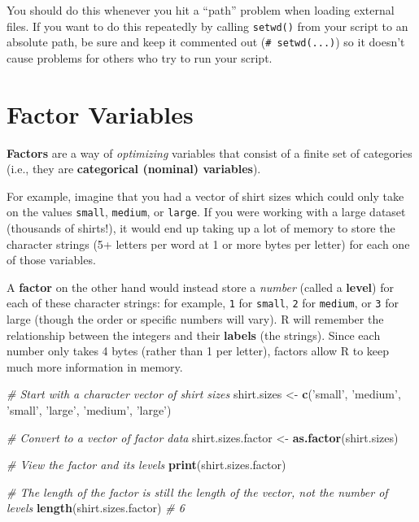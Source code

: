 \documentclass[]{book}
\newenvironment{Shaded}{\begin{snugshade}}{\end{snugshade}}
\newcommand{\KeywordTok}[1]{\textcolor[rgb]{0.13,0.29,0.53}{\textbf{#1}}}
\newcommand{\StringTok}[1]{\textcolor[rgb]{0.31,0.60,0.02}{#1}}
\newcommand{\CommentTok}[1]{\textcolor[rgb]{0.56,0.35,0.01}{\textit{#1}}}
\newcommand{\NormalTok}[1]{#1}
\theoremstyle{definition}
\theoremstyle{definition}
\theoremstyle{remark}
\begin{document}
You should do this whenever you hit a ``path'' problem when loading
external files. If you want to do this repeatedly by calling
\texttt{setwd()} from your script to an absolute path, be sure and keep
it commented out (\texttt{\#\ setwd(...)}) so it doesn't cause problems
for others who try to run your script.

\hypertarget{factors}{\section{Factor Variables}\label{factors}}

\textbf{Factors} are a way of \emph{optimizing} variables that consist
of a finite set of categories (i.e., they are \textbf{categorical
(nominal) variables}).

For example, imagine that you had a vector of shirt sizes which could
only take on the values \texttt{small}, \texttt{medium}, or
\texttt{large}. If you were working with a large dataset (thousands of
shirts!), it would end up taking up a lot of memory to store the
character strings (5+ letters per word at 1 or more bytes per letter)
for each one of those variables.

A \textbf{factor} on the other hand would instead store a \emph{number}
(called a \textbf{level}) for each of these character strings: for
example, \texttt{1} for \texttt{small}, \texttt{2} for \texttt{medium},
or \texttt{3} for large (though the order or specific numbers will
vary). R will remember the relationship between the integers and their
\textbf{labels} (the strings). Since each number only takes 4 bytes
(rather than 1 per letter), factors allow R to keep much more
information in memory.

\begin{Shaded}
\begin{Highlighting}[]
\CommentTok{# Start with a character vector of shirt sizes}
\NormalTok{shirt.sizes <-}\StringTok{ }\KeywordTok{c}\NormalTok{(}\StringTok{'small'}\NormalTok{, }\StringTok{'medium'}\NormalTok{, }\StringTok{'small'}\NormalTok{, }\StringTok{'large'}\NormalTok{, }\StringTok{'medium'}\NormalTok{, }\StringTok{'large'}\NormalTok{)}

\CommentTok{# Convert to a vector of factor data}
\NormalTok{shirt.sizes.factor <-}\StringTok{ }\KeywordTok{as.factor}\NormalTok{(shirt.sizes)}

\CommentTok{# View the factor and its levels}
\KeywordTok{print}\NormalTok{(shirt.sizes.factor)}

\CommentTok{# The length of the factor is still the length of the vector, not the number of levels}
\KeywordTok{length}\NormalTok{(shirt.sizes.factor)  }\CommentTok{# 6}
\end{Highlighting}
\end{Shaded}
\end{document}
